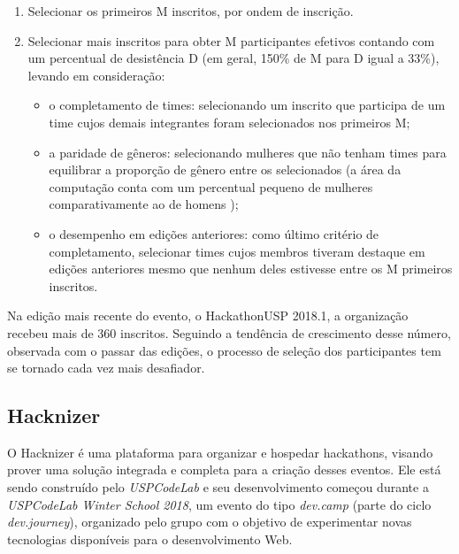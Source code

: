 \documentclass[10pt,twoside,a4paper]{article}
\begin{document}
    \begin{enumerate}
      \item Selecionar os primeiros M inscritos, por ondem de inscrição.
     
      \item Selecionar mais inscritos para obter M participantes efetivos contando com um percentual de desistência D (em geral, 150\% de M para D igual a 33\%), levando em consideração: 
      
      \begin{itemize}
          \item o completamento de times: selecionando um inscrito que participa de um time cujos demais integrantes foram selecionados nos primeiros M;
          \item a paridade de gêneros: selecionando mulheres que não tenham times para equilibrar a proporção de gênero entre os selecionados (a área da computação conta com um percentual pequeno de mulheres comparativamente ao de homens \cite{Frenkel1990WomenComputing});
          \item o desempenho em edições anteriores: como último critério de completamento, selecionar times cujos membros tiveram destaque em edições anteriores mesmo que nenhum deles estivesse entre os M primeiros inscritos.
      \end{itemize}   
    \end{enumerate}
    
        
    Na edição mais recente do evento, o HackathonUSP 2018.1, a organização recebeu mais de 360 inscritos. Seguindo a tendência de crescimento desse número, observada com o passar das edições, o processo de seleção dos participantes tem se tornado cada vez mais desafiador.
    
  \subsection{Hacknizer}

    O Hacknizer é uma plataforma para organizar e hospedar hackathons, visando prover uma solução integrada e completa para a criação desses eventos. Ele está sendo construído pelo \textit{USPCodeLab} e seu desenvolvimento começou durante a \textit{USPCodeLab Winter School 2018}, um evento do tipo \textit{dev.camp} (parte do ciclo \textit{dev.journey}), organizado pelo grupo com o objetivo de experimentar novas tecnologias disponíveis para o desenvolvimento Web.
    
\end{document}
